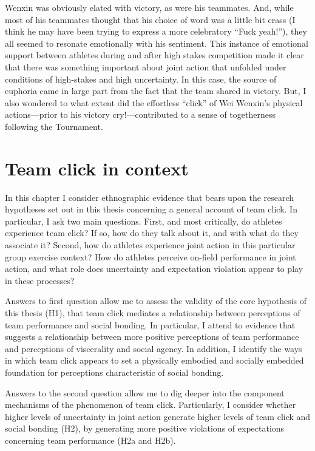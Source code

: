 \begin{CJK}{UTF8}{gbsn}
Wenxin was obviously elated with victory, as were his teammates. And, while most of his teammates thought that his choice of word was a little bit crass (I think he may have been trying to express a more celebratory ``Fuck yeah!''), they all seemed to resonate emotionally with his sentiment.  This instance of emotional support between athletes during and after high stakes competition made it clear that there was something important about joint action that unfolded under conditions of high-stakes and high uncertainty. In this case, the source of euphoria came in large part from the fact that the team shared in victory.  But, I also wondered to what extent did the effortless ``click'' of Wei Wenxin's physical actions---prior to his victory cry!---contributed to a sense of togetherness following the Tournament.








\section{Team click in context}
In this chapter I consider ethnographic evidence that bears upon the research hypotheses set out in this thesis concerning a general account of team click.  In particular, I ask two main questions.  First, and most critically, do athletes experience team click? If so, how do they talk about it, and with what do they associate it?  Second, how do athletes experience joint action in this particular group exercise context?  How do athletes perceive on-field performance in joint action, and what role does uncertainty and expectation violation appear to play in these processes?

Answers to first question allow me to assess the validity of the core hypothesis of this thesis (H1), that team click mediates a relationship between perceptions of team performance and social bonding. In particular, I attend to evidence that suggests a relationship between more positive perceptions of team performance and perceptions of viscerality and social agency. In addition, I identify the ways in which team click appears to set a physically embodied and socially embedded foundation for perceptions characteristic of social bonding.

Answers to the second question allow me to dig deeper into the component mechanisms of the phenomenon of team click.  Particularly, I consider whether higher levels of uncertainty in joint action generate higher levels of team click and social bonding (H2), by generating more positive violations of expectations concerning team performance (H2a and H2b).


\end{CJK}
